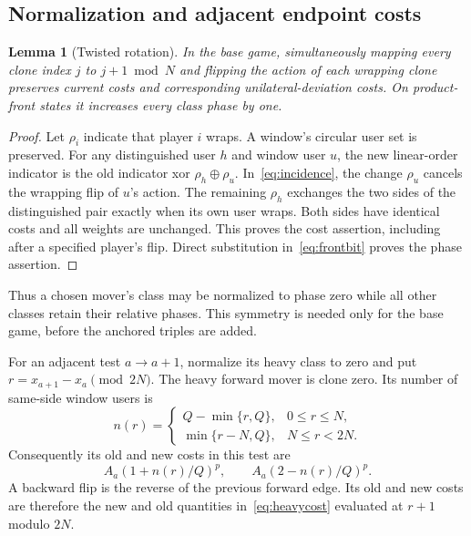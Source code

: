 \documentclass[11pt]{article}
\newtheorem{lemma}[theorem]{Lemma}
\theoremstyle{definition}
\theoremstyle{remark}
\newcommand{\xor}{\mathbin{\oplus}}
\begin{document}
\subsection{Normalization and adjacent endpoint costs}
\begin{lemma}[Twisted rotation]\label{lem:twist}
In the base game, simultaneously mapping every clone index $j$ to $j+1\bmod N$ and flipping the action of each wrapping clone preserves current costs and corresponding unilateral-deviation costs. On product-front states it increases every class phase by one.
\end{lemma}
\begin{proof}
Let $\rho_i$ indicate that player $i$ wraps. A window's circular user set is preserved. For any distinguished user $h$ and window user $u$, the new linear-order indicator is the old indicator xor $\rho_h\xor\rho_u$. In~\eqref{eq:incidence}, the change $\rho_u$ cancels the wrapping flip of $u$'s action. The remaining $\rho_h$ exchanges the two sides of the distinguished pair exactly when its own user wraps. Both sides have identical costs and all weights are unchanged. This proves the cost assertion, including after a specified player's flip. Direct substitution in~\eqref{eq:frontbit} proves the phase assertion.
\end{proof}
Thus a chosen mover's class may be normalized to phase zero while all other classes retain their relative phases. This symmetry is needed only for the base game, before the anchored triples are added.

For an adjacent test $a\to a+1$, normalize its heavy class to zero and put $r=x_{a+1}-x_a\pmod{2N}$. The heavy forward mover is clone zero. Its number of same-side window users is
\begin{equation}\label{eq:nr}
 n(r)=\begin{cases}
 Q-\min\{r,Q\},&0\le r\le N,\\
 \min\{r-N,Q\},&N\le r<2N.
 \end{cases}
\end{equation}
Consequently its old and new costs in this test are
\begin{equation}\label{eq:heavycost}
 A_a(1+n(r)/Q)^p,\qquad A_a(2-n(r)/Q)^p.
\end{equation}
A backward flip is the reverse of the previous forward edge. Its old and new costs are therefore the new and old quantities in~\eqref{eq:heavycost} evaluated at $r+1$ modulo $2N$.
\end{document}
